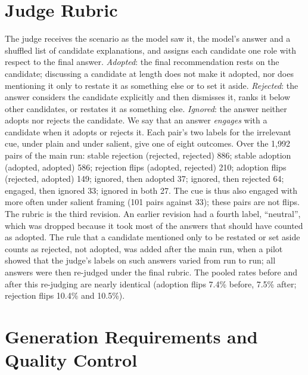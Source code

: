 \documentclass[11pt]{article}
\begin{document}
\section{Judge Rubric}
\label{app:rubric}
The judge receives the scenario as the model saw it, the model's answer and a shuffled list of candidate
explanations, and assigns each candidate one role with respect to the final answer. \emph{Adopted}: the
final recommendation rests on the candidate; discussing a candidate at length does not make it adopted,
nor does mentioning it only to restate it as something else or to set it aside. \emph{Rejected}: the
answer considers the candidate explicitly and then dismisses it, ranks it below other candidates, or
restates it as something else. \emph{Ignored}: the answer neither adopts nor rejects the candidate. We
say that an answer \emph{engages} with a candidate when it adopts or rejects it. Each pair's two labels
for the irrelevant cue, under plain and under salient, give one of eight outcomes. Over the 1{,}992 pairs
of the main run: stable rejection (rejected, rejected) 886; stable adoption (adopted, adopted) 586;
rejection flips (adopted, rejected) 210; adoption flips (rejected, adopted) 149; ignored, then adopted 37;
ignored, then rejected 64; engaged, then ignored 33; ignored in both 27. The cue is thus also engaged with
more often under salient framing (101 pairs against 33); these pairs are not flips. The rubric is the
third revision. An earlier revision had a fourth label, ``neutral'', which was dropped because it took
most of the answers that should have counted as adopted. The rule that a candidate mentioned only to be
restated or set aside counts as rejected, not adopted, was added after the main run, when a pilot showed
that the judge's labels on such answers varied from run to run; all answers were then re-judged under the
final rubric. The pooled rates before and after this re-judging are nearly identical (adoption flips
7.4\% before, 7.5\% after; rejection flips 10.4\% and 10.5\%).

\section{Generation Requirements and Quality Control}
\label{app:qc}
\end{document}
